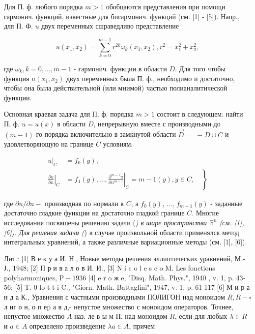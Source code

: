 \documentclass[10pt]{article}
\begin{document}
Для П. ф. любого порядка $m>1$ обобцаются представления при помощи гармонич. функций, известные для бигармонич. функций (см. [1] - [5]). Напр., для П. Ф. $u$ двух переменных сшраведливо представление



\[

u\left(x_{1}, x_{2}\right)=\sum_{k=0}^{m-1} r^{2 k} \omega_{k}\left(x_{1}, x_{2}\right), r^{2}=x_{1}^{2}+x_{2}^{2},

\]



где $\omega_{k}, k=0, \ldots, m-1$ - гармонич. функции в области $D$. Для того чтобы функция $u\left(x_{1}, x_{2}\right)$ двух переменных была П. ф., необходимо и достаточно, чтобы она была действительной (или мнимой) частью полианалитической функции.



Основная краевая задача для П. ф. порядка $m>1$ состоит в следующем: найти П. ф. $u=u(x)$ в области $D$, непрерывную вместе с производными до $(m-1)$-го порядка включительно в замкнутой области $\vec{D}=$ $\equiv D \cup C$ и удовлетворяющую на границе $C$ условиям:



\[

\begin{aligned}

\left.u\right|_{C} & =f_{0}(y), \\

\left.\frac{\partial u}{\partial n}\right|_{C} & \left.=f_{1}(y), \ldots,\left.\frac{\partial^{m-1} u}{\partial n^{m-1}}\right|_{C}=m-1(y), y \in C, \quad\right\}

\end{aligned}

\]



где $\partial u / \partial n-$ производная по нормали к $C$, а $f_{0}(y)$, ..., $f_{m-1}(y)$ - заданные достаточно гладкие функции на достаточно гладкой границе $C$. Многие исследования посвяшены решению задачи (\textit{) в шаре пространства $\mathbb{R}^{n}$ (см. [1], [6]). Для решения задачи (}) в случае произвольной области применялся метод интегральных уравнений, а также различные вариационные методы (см. [1], [6]).



Лит.: [1] В е к у а И. Н., Новые методы решения эллиптических уравнений, М.-Ј., 1948; [2] П р и в а л о в И. И., [3] $\mathrm{N}$ i c o l e s c o $\mathrm{M}$. Les fonctions polyharmoniques, $\mathrm{P}-1936$ [4] e r o ж e, "Disq. Math. Phys.", 1940 , v. 1, p. 43-56; [5] T. 0 lo t t i C., "Giorn. Math. Battaglini", 1947, v. 1, p. 61-117 [6] М и р а н д а К., Уравнения с частными производными ПОЛИГОН над моноидом $R, R-\square$ л иг о н, о п еp а в д,- непустое множество с моноидом операторов. Точнее, непустое множество $A$ наз. ле в ы м П. над моноидом $R$, если для любых $\lambda \in R$ и $a \in A$ определено произведение $\lambda a \in A$, причем
\end{document}

